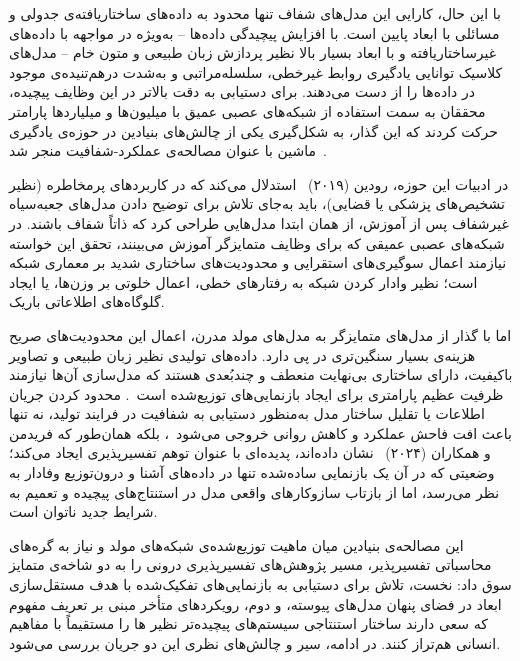 با این حال، کارایی این مدل‌های شفاف تنها محدود به داده‌های ساختاریافته‌ی جدولی و مسائلی با ابعاد پایین است. با افزایش پیچیدگی داده‌ها – به‌ویژه در مواجهه با داده‌های غیرساختاریافته و با ابعاد بسیار بالا نظیر پردازش زبان طبیعی و متون خام – مدل‌های کلاسیک توانایی یادگیری روابط غیرخطی، سلسله‌مراتبی و به‌شدت درهم‌تنیده‌ی موجود در داده‌ها را از دست می‌دهند. برای دستیابی به دقت بالاتر در این وظایف پیچیده، محققان به سمت استفاده از شبکه‌های عصبی عمیق با میلیون‌ها و میلیاردها پارامتر حرکت کردند که این گذار، به شکل‌گیری یکی از چالش‌های بنیادین در حوزه‌ی یادگیری ماشین با عنوان مصالحه‌ی عملکرد-شفافیت منجر شد~\cite{doshivelez2017rigorous}.

در ادبیات این حوزه، رودین (۲۰۱۹)~\cite{rudin2019stop} استدلال می‌کند که در کاربردهای پرمخاطره (نظیر تشخیص‌های پزشکی یا قضایی)، باید به‌جای تلاش برای توضیح دادن مدل‌های جعبه‌سیاه غیرشفاف پس از آموزش، از همان ابتدا مدل‌هایی طراحی کرد که ذاتاً شفاف باشند. در شبکه‌های عصبی عمیقی که برای وظایف متمایزگر آموزش می‌بینند، تحقق این خواسته نیازمند اعمال سوگیری‌های استقرایی و محدودیت‌های ساختاری شدید بر معماری شبکه است؛ نظیر وادار کردن شبکه به رفتارهای خطی، اعمال خلوتی بر وزن‌ها، یا ایجاد گلوگاه‌های اطلاعاتی باریک.

اما با گذار از مدل‌های متمایزگر به مدل‌های مولد مدرن، اعمال این محدودیت‌های صریح هزینه‌ی بسیار سنگین‌تری در پی دارد. داده‌های تولیدی نظیر زبان طبیعی و تصاویر باکیفیت، دارای ساختاری بی‌نهایت منعطف و چندبُعدی هستند که مدل‌سازی آن‌ها نیازمند ظرفیت عظیم پارامتری برای ایجاد بازنمایی‌های توزیع‌شده است~\cite{elhage2022toymodels}. محدود کردن جریان اطلاعات یا تقلیل ساختار مدل به‌منظور دستیابی به شفافیت در فرایند تولید، نه تنها باعث افت فاحش عملکرد و کاهش روانی خروجی می‌شود~\cite{schneider2024explainable}، بلکه همان‌طور که فریدمن و همکاران (۲۰۲۴)~\cite{friedman2024interpretability} نشان داده‌اند، پدیده‌ای با عنوان توهم تفسیرپذیری ایجاد می‌کند؛ وضعیتی که در آن یک بازنمایی ساده‌شده تنها در داده‌های آشنا و درون‌توزیع وفادار به نظر می‌رسد، اما از بازتاب سازوکارهای واقعی مدل در استنتاج‌های پیچیده و تعمیم به شرایط جدید ناتوان است.

این مصالحه‌ی بنیادین میان ماهیت توزیع‌شده‌ی شبکه‌های مولد و نیاز به گره‌های محاسباتی تفسیرپذیر، مسیر پژوهش‌های تفسیرپذیری درونی را به دو شاخه‌ی متمایز سوق داد: نخست، تلاش برای دستیابی به بازنمایی‌های تفکیک‌شده با هدف مستقل‌سازی ابعاد در فضای پنهان مدل‌های پیوسته، و دوم، رویکردهای متأخر مبنی بر تعریف مفهوم که سعی دارند ساختار استنتاجی سیستم‌های پیچیده‌تر نظیر ها را مستقیماً با مفاهیم انسانی هم‌تراز کنند. در ادامه، سیر و چالش‌های نظری این دو جریان بررسی می‌شود.


